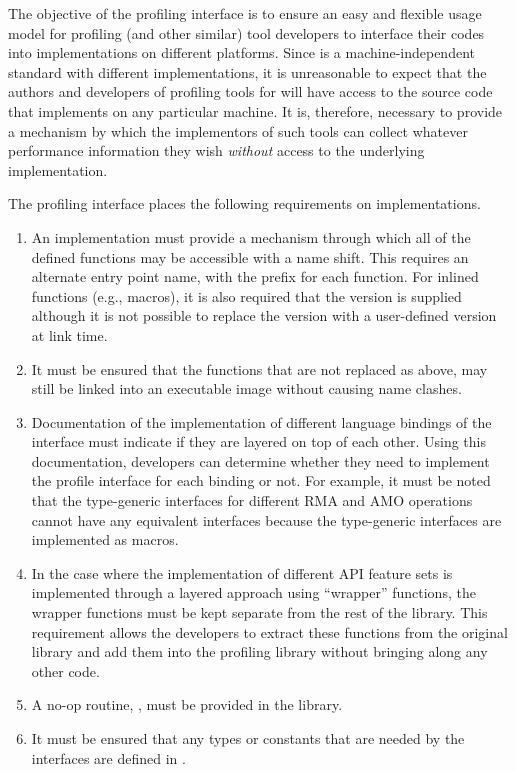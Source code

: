The objective of the \openshmem profiling interface is to ensure an
easy and flexible usage model for profiling (and other similar)
tool developers to interface their codes into \openshmem
implementations on different platforms. Since \openshmem is a
machine-independent standard with different implementations, it is
unreasonable to expect that the authors and developers of profiling
tools for \openshmem will have access to the source code that
implements \openshmem on any particular machine. It is, therefore,
necessary to provide a mechanism by which the implementors of such
tools can collect whatever performance information they wish
\emph{without} access to the underlying implementation.

The \openshmem profiling interface places the following requirements
on implementations.

\begin{enumerate}
\item An \openshmem implementation must provide a mechanism through
which all of the \openshmem defined functions may be accessible
with a name shift. This requires an alternate
entry point name, with the prefix  for each
\openshmem function. For \openshmem inlined functions (e.g., macros),
it is also required that the  version is supplied
although it is not possible to replace the  version
with a user-defined version at link time.
\item It must be ensured that the \openshmem functions that are not
replaced as above, may still be linked into an executable image
without causing name clashes.
\item Documentation of the implementation of different language
bindings of the \openshmem interface must indicate if they
are layered on top of each other. Using this documentation,
developers can determine whether they need to implement the
profile interface for each binding or not. For example, it must
be noted that the \openshmem \Cstd[11] type-generic interfaces for
different \ac{RMA} and \ac{AMO} operations cannot have any equivalent
 interfaces because the \Cstd[11] type-generic
interfaces are implemented as macros.
\item In the case where the implementation of different \ac{API}
feature sets is implemented through a layered approach using
``wrapper'' functions, the wrapper functions must be kept separate
from the rest of the library. This requirement allows the developers
to extract these functions from the original \openshmem library
and add them into the profiling library without bringing along any
other code.
\item A no-op routine, , must be provided
in the \openshmem library.
\item It must be ensured that any \openshmem types or constants that are
needed by the  interfaces are defined in .
\end{enumerate}

